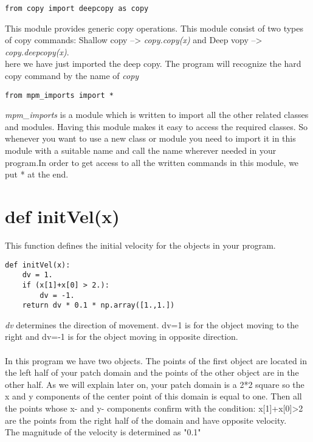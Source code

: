 \documentclass[11pt,fleqn]{book} %
\begin{document}
\begin{lstlisting}
from copy import deepcopy as copy
\end{lstlisting}

This module provides generic copy operations. This module consist of two types of copy commands: Shallow copy --> \emph{copy.copy(x)} and Deep vopy --> \emph{copy.deepcopy(x)}. \\
here we have just imported the deep copy. The program will recognize the hard copy command by the name of \emph{copy}

\begin{lstlisting}
from mpm_imports import *
\end{lstlisting}
\emph{mpm\_imports} is a module which is written to import all the other related classes and modules. Having this module makes it easy to access the required classes. So whenever you want to use a new class or module you need to import it in this module with a suitable name and call the name wherever needed in your program.In order to get access to all the written commands in this module, we put * at the end. 

\section{def initVel(x)}

This function defines the initial velocity for the objects in your program. \\ 

\begin{lstlisting}
def initVel(x):
    dv = 1.
    if (x[1]+x[0] > 2.):
        dv = -1.
    return dv * 0.1 * np.array([1.,1.])
\end{lstlisting}

\emph{dv} determines the direction of movement. dv=1 is for the object moving to the right and dv=-1 is for the object moving in opposite direction. \\ \\
In this program we have two objects. The points of the first object are located in the left half of your patch domain and the points of the other object are in the other half. As we will explain later on, your patch domain is a 2*2 square so the x and y components of the center point of this domain is equal to one. Then all the points whose x- and y- components confirm with the condition: x[1]+x[0]>2 are the points from the right half of the domain and have opposite velocity. 
\\ The magnitude of the velocity is determined as "0.1" 
\end{document}
